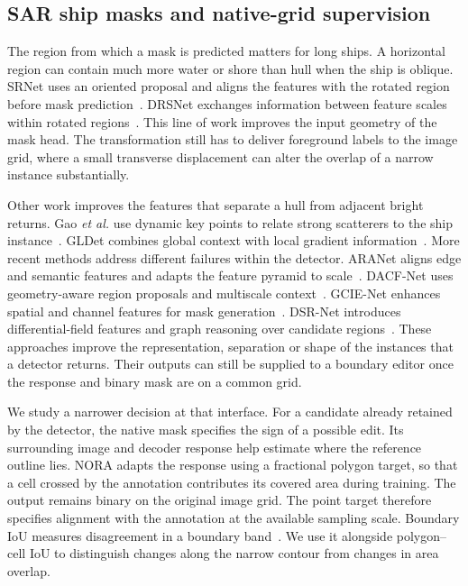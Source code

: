\documentclass[journal]{IEEEtran}
\begin{document}
\subsection{SAR ship masks and native-grid supervision}

The region from which a mask is predicted matters for long ships. A horizontal region can contain much more water or shore than hull when the ship is oblique. SRNet uses an oriented proposal and aligns the features with the rotated region before mask prediction~\cite{rsdd}. DRSNet exchanges information between feature scales within rotated regions~\cite{drsnet}. This line of work improves the input geometry of the mask head. The transformation still has to deliver foreground labels to the image grid, where a small transverse displacement can alter the overlap of a narrow instance substantially.

Other work improves the features that separate a hull from adjacent bright returns. Gao \emph{et al.} use dynamic key points to relate strong scatterers to the ship instance~\cite{gao2024}. GLDet combines global context with local gradient information~\cite{gldet}. More recent methods address different failures within the detector. ARANet aligns edge and semantic features and adapts the feature pyramid to scale~\cite{aranet}. DACF-Net uses geometry-aware region proposals and multiscale context~\cite{dacf}. GCIE-Net enhances spatial and channel features for mask generation~\cite{gcie}. DSR-Net introduces differential-field features and graph reasoning over candidate regions~\cite{dsr}. These approaches improve the representation, separation or shape of the instances that a detector returns. Their outputs can still be supplied to a boundary editor once the response and binary mask are on a common grid.

We study a narrower decision at that interface. For a candidate already retained by the detector, the native mask specifies the sign of a possible edit. Its surrounding image and decoder response help estimate where the reference outline lies. NORA adapts the response using a fractional polygon target, so that a cell crossed by the annotation contributes its covered area during training. The output remains binary on the original image grid. The point target therefore specifies alignment with the annotation at the available sampling scale. Boundary IoU measures disagreement in a boundary band~\cite{boundaryiou}. We use it alongside polygon--cell IoU to distinguish changes along the narrow contour from changes in area overlap.
\end{document}
